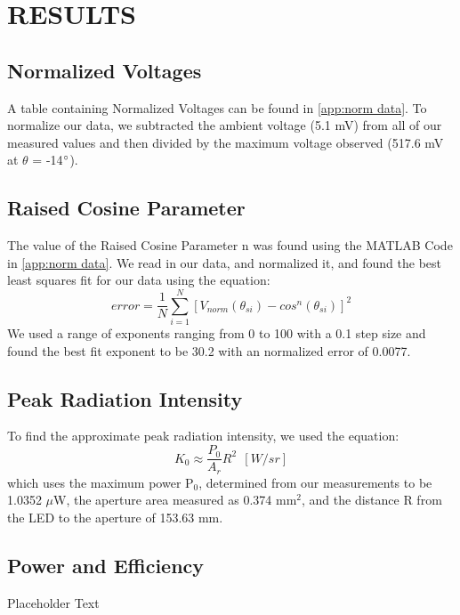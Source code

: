 \section{RESULTS}

\subsection{Normalized Voltages}
A table containing Normalized Voltages can be found in \autoref{app:norm data}. To normalize our data, we subtracted the ambient voltage (5.1 mV) from all of our measured values and then divided by the maximum voltage observed (517.6 mV at $\theta$ = -14$\degree$).
\subsection{Raised Cosine Parameter}
The value of the Raised Cosine Parameter n was found using the MATLAB Code in \autoref{app:norm data}. We read in our data, and normalized it, and found the best least squares fit for our data using the equation:
\[error = \frac{1}{N}\sum_{i=1}^{N}[V_{norm}(\theta_{si}) - cos^{n}(\theta_{si})]^{2}\]
We used a range of exponents ranging from 0 to 100 with a 0.1 step size and found the best fit exponent to be 30.2 with an normalized error of 0.0077.

\subsection{Peak Radiation Intensity}
To find the approximate peak radiation intensity, we used the equation:
\[K_{0}\approx \frac{P_{0}}{A_{r}}R^{2}\: \: [W/sr]\]
which uses the maximum power P$_0$, determined from our measurements to be 1.0352 $\mu$W, the aperture area measured as 0.374 mm$^2$, and the distance R from the LED to the aperture of 153.63 mm. 
\subsection{Power and Efficiency}
Placeholder Text


